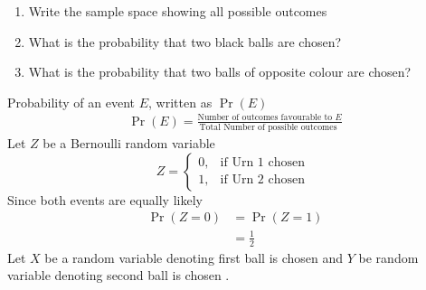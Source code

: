 \documentclass[journal,12pt,twocolumn]{IEEEtran}
\providecommand{\pr}[1]{\ensuremath{\Pr\left(#1\right)}}
\begin{document}
\begin{enumerate}[label=(\alph*)]
\item Write the sample space showing all possible outcomes

\item What is the probability that two black balls are chosen?

\item What is the probability that two balls of opposite colour are chosen?
\end{enumerate}


\solution

Probability of an event $E$, written as $\pr{E}$
\begin{align}
\pr{E}=\displaystyle\frac{\text{Number of outcomes favourable to $E$}}{\text{Total Number of possible outcomes }}
\end{align}
Let $Z$ be a Bernoulli random variable
 \begin{equation}
    Z=
    \begin{cases}
      0, & \text{if Urn 1 chosen }\\
      1, & \text{if Urn 2 chosen}
    \end{cases}
  \end{equation}
  Since both events are equally likely
  \begin{align}
  \pr{Z=0} &= \pr{Z=1}\\
         &=\frac{1}{2}
  \end{align}
Let $X$ be a random variable denoting first ball is chosen and
 $Y$ be random variable denoting second ball is chosen .

\begin{table}[ht!]
		\centering
		
		\caption{}
		\label{table:table1}	
	\end{table}

\begin{table}[ht!]
		\centering
		
		\caption{}
		\label{table:table2}	
	\end{table}
\end{document}
